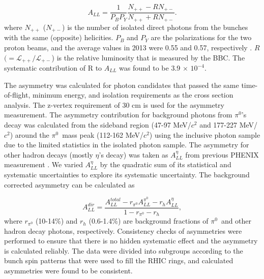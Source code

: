 \documentclass[twocolumn,letterpaper,aps,prl,longbibliography,superscriptaddress,floatfix]{revtex4-2}
\newcommand{\pizero}{\ensuremath{\pi^0}}
\newcommand{\ALL}{\ensuremath{A_{LL}}}
\begin{document}
\begin{equation}
A_{LL} = \frac{1}{P_BP_Y} \frac{N_{++}-RN_{+-}}{N_{++}+RN_{+-}}.
\end{equation}
where $N_{++}$ ($N_{+-}$) is the number of isolated direct photons from the bunches with the same (opposite) helicities. $P_{B}$ and $P_{Y}$ are the polarizations for the two proton beams, and the average values in 2013 were 0.55 and 0.57, respectively \cite{POBLAGUEV2020164261}. $R$ $(= \mathcal{L_{++}}/\mathcal{L_{+-}}$) is the relative luminosity that is measured by the BBC. The systematic contribution of R to $A_{LL}$ was found to be 3.9 $\times$ $10^{-4}$.

The asymmetry was calculated for photon candidates that passed the same time-of-flight, minimum energy, and isolation requirements as the cross section analysis. The z-vertex requirement of 30 cm is used for the asymmetry measurement. The asymmetry contribution for background photons from \pizero's decay was calculated from the sideband region (47-97 MeV/$c^2$ and 177-227 MeV/$c^2$) around the \pizero\ mass peak (112-162 MeV/$c^2$) using the inclusive photon sample due to the limited statistics in the isolated photon sample. The asymmetry for other hadron decays (mostly $\eta$'s decay) was taken as $A_{LL}^{\eta}$ from previous PHENIX measurement \cite{PhysRevD.90.012007}. We varied $A_{LL}^{\eta}$ by the quadratic sum of its statistical and systematic uncertainties to explore its systematic uncertainty. The background corrected asymmetry can be calculated as

\begin{equation} \label{eq:all-dir}
A_{LL}^{dir} = \frac{A_{LL}^{total} - r_{\pi^0}A_{LL}^{\pi^0} -r_h A_{LL}^{\eta}}{1 - r_{\pi^0} - r_h},
\end{equation}
where $r_{\pi^0}$ (10-14\%) and $r_h$ (0.6-1.4\%) are background fractions of \pizero\ and other hadron decay photons, respectively. Consistency checks of asymmetries were performed to ensure that there is no hidden systematic effect and the asymmetry is calculated reliably. The data were divided into subgroups according to the bunch spin patterns that were used to fill the RHIC rings, and calculated asymmetries were found to be consistent.

\end{document}
